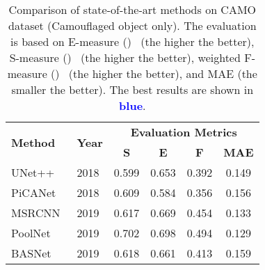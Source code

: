 \documentclass[journal]{IEEEtran}
\begin{document}
\begin{table}[!t]
\centering
	\caption{Comparison of state-of-the-art methods on CAMO dataset (Camouflaged object only). The evaluation is based on  E-measure ()~\cite{ephi} (the higher the better), S-measure ()~\cite{smeasure} (the higher the better), weighted F-measure ()~\cite{weightedf} (the higher the better), and MAE (the smaller the better). The best results are shown in \textcolor{blue}{\textbf{blue}}.}
\label{tab:sinet}
\footnotesize
\begin{tabular}{|l|l|cccc|}
\toprule
\multirow{2}{*}{\textbf{Method}}
 & \multirow{2}{*}{\textbf{Year}} &
 \multicolumn{4}{c|}{\textbf{Evaluation Metrics}} \\
 \cmidrule{3-6}
 & &
 \multicolumn{1}{c|}{\textbf{S} }                            & \multicolumn{1}{c|}{\textbf{E} }                            & \multicolumn{1}{c|}{\textbf{F} }                            & \multicolumn{1}{c|}{\textbf{MAE }}                            \\ \midrule
\multicolumn{1}{|l|}{UNet++~\cite{unet}}           & \multicolumn{1}{l|}{2018}          & \multicolumn{1}{l|}{0.599}                                 & \multicolumn{1}{l|}{0.653}                                 & \multicolumn{1}{l|}{0.392}                                 & \multicolumn{1}{c|}{0.149}                                 \\ \midrule
\multicolumn{1}{|l|}{PiCANet~\cite{picanet}}          & \multicolumn{1}{l|}{2018}          & \multicolumn{1}{l|}{0.609}                                 & \multicolumn{1}{l|}{0.584}                                 & \multicolumn{1}{l|}{0.356}                                 & \multicolumn{1}{c|}{0.156}                                 \\ \midrule
\multicolumn{1}{|l|}{MSRCNN~\cite{maskscore}}           & \multicolumn{1}{l|}{2019}          & \multicolumn{1}{l|}{0.617}                                 & \multicolumn{1}{l|}{0.669}                                 & \multicolumn{1}{l|}{0.454}                                 & \multicolumn{1}{c|}{0.133}                                 \\ \midrule
\multicolumn{1}{|l|}{PoolNet~\cite{poolnet}}          & \multicolumn{1}{l|}{2019}          & \multicolumn{1}{l|}{0.702}                                 & \multicolumn{1}{l|}{0.698}                                 & \multicolumn{1}{l|}{0.494}                                 & \multicolumn{1}{c|}{0.129}                                 \\ \hline
\multicolumn{1}{|l|}{BASNet~\cite{basnet}}           & \multicolumn{1}{l|}{2019}          & \multicolumn{1}{l|}{0.618}                                 & \multicolumn{1}{l|}{0.661}                                 & \multicolumn{1}{l|}{0.413}                                 & \multicolumn{1}{c|}{0.159}                                 \\ \midrule

\end{tabular}
\end{table}
\end{document}
